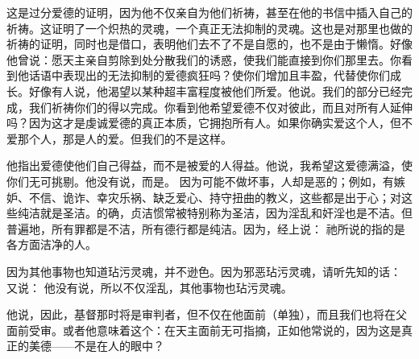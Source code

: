 \par

这是过分爱德的证明，因为他不仅亲自为他们祈祷，甚至在他的书信中插入自己的祈祷。这证明了一个炽热的灵魂，一个真正无法抑制的灵魂。这也是对那里也做的祈祷的证明，同时也是借口，表明他们去不了不是自愿的，也不是由于懒惰。好像他曾说：愿天主亲自剪除到处分散我们的诱惑，使我们能直接到你们那里去。你看到他话语中表现出的无法抑制的爱德疯狂吗？使你们增加且丰盈，代替使你们成长。好像有人说，他渴望以某种超丰富程度被他们所爱。他说。我们的部分已经完成，我们祈祷你们的得以完成。你看到他希望爱德不仅对彼此，而且对所有人延伸吗？因为这才是虔诚爱德的真正本质，它拥抱所有人。如果你确实爱这个人，但不爱那个人，那是人的爱。但我们的不是这样。\par

 \par

他指出爱德使他们自己得益，而不是被爱的人得益。他说，我希望这爱德满溢，使你们无可挑剔。他没有说，而是。 因为可能不做坏事，人却是恶的；例如，有嫉妒、不信、诡诈、幸灾乐祸、缺乏爱心、持守扭曲的教义，这些都是出于心；对这些纯洁就是圣洁。的确，贞洁惯常被特别称为圣洁，因为淫乱和奸淫也是不洁。但普遍地，所有罪都是不洁，所有德行都是纯洁。因为，经上说： 祂所说的指的是各方面洁净的人。\par

因为其他事物也知道玷污灵魂，并不逊色。因为邪恶玷污灵魂，请听先知的话： 又说： 他没有说，所以不仅淫乱，其他事物也玷污灵魂。\par

他说，因此，基督那时将是审判者，但不仅在他面前（单独），而且我们也将在父面前受审。或者他意味着这个：在天主面前无可指摘，正如他常说的，因为这是真正的美德——不是在人的眼中？\par

